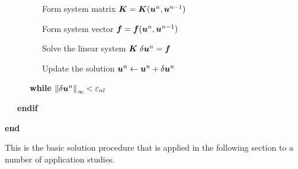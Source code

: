 \begin{algorithm}[!htb]
\begin{minipage}{.95\textwidth}
\begin{list}{:\ \ }{}
 	\item \ \ \ \ \ \ \ \ \ Form system matrix $\bt{K} = \bt{K}(\bv{u}^n,\bv{u}^{n-1})$
 	\item \ \ \ \ \ \ \ \ \ Form system vector $\bv{f}= \bv{f}(\bv{u}^n,\bv{u}^{n-1})$
 	\item \ \ \ \ \ \ \ \ \ Solve the linear system $\bt{K} \; \delta\bv{u}^n = \bv{f}$
	\item \ \ \ \ \ \ \ \ \ Update the solution $\bv{u}^n \leftarrow \bv{u}^n + \delta\bv{u}^n$
 	\item \ \ \ \ \ \ \textbf{while} $\norm[\infty]{\delta\bv{u}^n} < \varepsilon_{nl}$
        \item \ \ \ \textbf{endif}
        \item \textbf{end} \\
      \end{list}
    \end{minipage}
\end{algorithm}
This is the basic solution procedure that is applied in the following section to a number of application studies.


